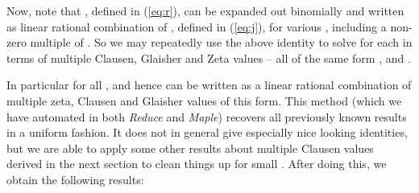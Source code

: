 \documentclass[a4paper,a4paper]{article}
\providecommand{\mcl}{\operatorname{mcl}}
\providecommand{\mgl}{\operatorname{mgl}}
\begin{document}
\vspace{\baselineskip}

Now, note that \coordHE{}, defined in (\ref{eq:r}), can be expanded out
 binomially and
written
as linear
 rational combination of \coordHE{}, defined in (\ref{eq:j}), for various
 \coordHE{}, including
 a non-zero multiple of \coordHE{}.
 So we may repeatedly use the above identity to solve for each
 \coordHE{} in terms of multiple Clausen, Glaisher and Zeta values -- all
 of the same form
 \myHighlight{$ \mcl(n, \{ 1 \}_k)$}\coordHE{}, \myHighlight{$ \mgl(n, \{ 1 \}_k)$}\coordHE{} and \coordHE{}.

In particular for all \coordHE{}, \coordHE{} and hence \coordHE{} can be
 written as a linear rational combination of multiple zeta, Clausen and Glaisher
  values of this form.
   This method (which we have automated in both {\em Reduce} and {\em Maple})
    recovers all previously known results in a uniform fashion.
    It does not in general give especially nice looking identities,
    but we are able to apply some other results about multiple Clausen values
    derived in the next section to clean things up for small \coordHE{}.
     After doing this, we obtain the following results:
\end{document}

